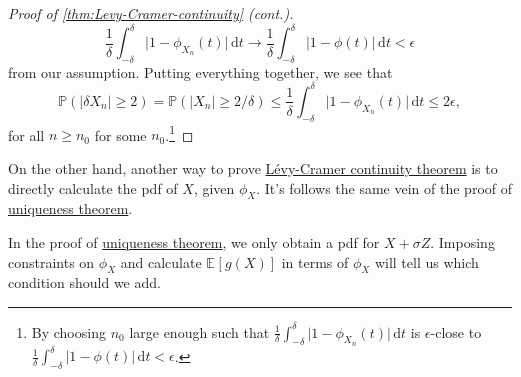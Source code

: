 \begin{proof}[Proof of \autoref{thm:Levy-Cramer-continuity} (cont.)]
	\[
		\frac{1}{\delta } \int_{-\delta }^{\delta } \vert 1 - \phi _{X_n}(t) \vert  \,\mathrm{d}t
		\to \frac{1}{\delta } \int_{-\delta }^{\delta } \vert 1 - \phi (t) \vert  \,\mathrm{d}t
		< \epsilon
	\]
	from our assumption. Putting everything together, we see that
	\[
		\mathbb{P} (\vert \delta X_n \vert \geq 2)
		= \mathbb{P} (\vert X_n \vert \geq 2 / \delta )
		\leq \frac{1}{\delta } \int_{-\delta }^{\delta } \vert 1 - \phi _{X_n}(t) \vert  \,\mathrm{d}t
		\leq 2 \epsilon ,
	\]
	for all \(n \geq n_0\) for some \(n_0\).\footnote{By choosing \(n_0\) large enough such that \(\frac{1}{\delta } \int_{-\delta }^{\delta } \vert 1 - \phi _{X_n}(t) \vert  \,\mathrm{d}t\) is \(\epsilon \)-close to \(\frac{1}{\delta } \int_{-\delta }^{\delta } \vert 1 - \phi (t) \vert  \,\mathrm{d}t < \epsilon \).}
\end{proof}

On the other hand, another way to prove \hyperref[thm:Levy-Cramer-continuity]{Lévy-Cramer continuity theorem} is to directly calculate the pdf of \(X\), given \(\phi _X\). It's follows the same vein of the proof of \hyperref[thm:characteristic-function-uniqueness]{uniqueness theorem}.

\begin{intuition}
	In the proof of \hyperref[thm:characteristic-function-uniqueness]{uniqueness theorem}, we only obtain a pdf for \(X + \sigma Z\). Imposing constraints on \(\phi _X\) and calculate \(\mathbb{E}_{}[g(X)] \) in terms of \(\phi _X\) will tell us which condition should we add.
\end{intuition}

